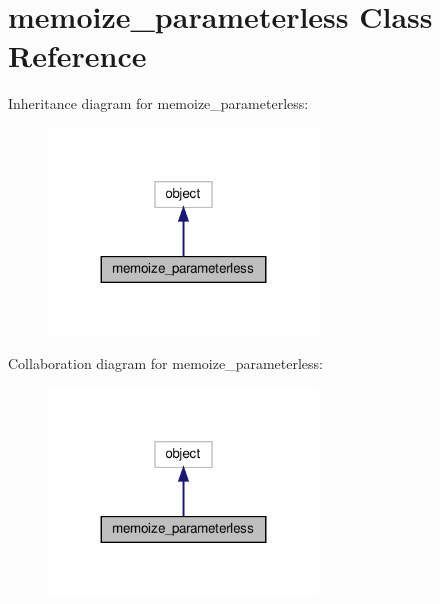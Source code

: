 \hypertarget{classvlc_1_1memoize__parameterless}{}\section{memoize\+\_\+parameterless Class Reference}
\label{classvlc_1_1memoize__parameterless}


Inheritance diagram for memoize\+\_\+parameterless\+:
\nopagebreak
\begin{figure}[H]
\begin{center}
\leavevmode
\includegraphics[width=203pt]{classvlc_1_1memoize__parameterless__inherit__graph}
\end{center}
\end{figure}


Collaboration diagram for memoize\+\_\+parameterless\+:
\nopagebreak
\begin{figure}[H]
\begin{center}
\leavevmode
\includegraphics[width=203pt]{classvlc_1_1memoize__parameterless__coll__graph}
\end{center}
\end{figure}
